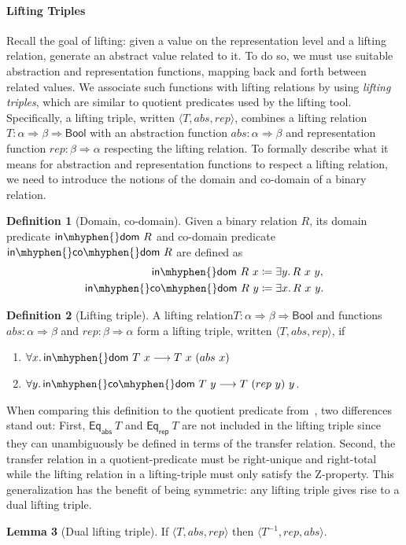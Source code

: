 \documentclass{article}
\theoremstyle{definition}
\newtheorem{definition}{Definition}[section]
\newtheorem{lemma}[definition]{Lemma}
\newcommand{\inv}{^{-1}}
\newcommand{\indom}{\mathsf{in\mhyphen{}dom}}
\newcommand{\incodom}{\mathsf{in\mhyphen{}co\mhyphen{}dom}}
\newcommand{\bool}{\mathsf{Bool}}
\newcommand{\eqrep}{\mathsf{Eq_{rep}}}
\newcommand{\eqabs}{\mathsf{Eq_{abs}}}
\newcommand{\liftrel}{lifting relation\xspace}
\newcommand{\liftrels}{lifting relations\xspace}
\begin{document}
\paragraph{Lifting Triples}
Recall the goal of lifting:
given a value on the representation level and a \liftrel,
generate an abstract value related to it.
To do so, we must use suitable abstraction and representation functions,
mapping back and forth between related values.
We associate such functions with \liftrels by using \emph{lifting triples},
which are similar to quotient predicates used by the lifting tool.
Specifically, a lifting triple,
written \(\langle T, abs, rep \rangle\),
combines a
lifting relation \(T : \alpha \Rightarrow \beta \Rightarrow \bool\) with an abstraction function \(abs : \alpha \Rightarrow \beta\) and representation function \(rep : \beta \Rightarrow \alpha\) respecting the
lifting relation.
To formally describe what it means for abstraction and representation functions to respect a \liftrel,
we need to introduce the notions of the domain and co-domain of a binary relation.
\begin{definition}[Domain, co-domain]
	Given a binary relation \(R\), its domain predicate \(\indom\ R\) and co-domain predicate \(\incodom\ R\) are defined as
	\begin{align*}
		\indom\ R\ x &\coloneqq \exists y\ldotp R\ x\ y, \\
		\incodom\ R\ y &\coloneqq \exists x\ldotp R\ x\ y.
	\end{align*}
\end{definition}
\begin{definition}[Lifting triple]\label{def-lifting-triple}
	A \liftrel \(T : \alpha \Rightarrow \beta \Rightarrow \bool\) and functions \(abs : \alpha \Rightarrow \beta\) and \(rep : \beta \Rightarrow \alpha\) form a lifting triple, written \(\langle T, abs, rep \rangle\), if
	\begin{enumerate}
    \item $\forall x\ldotp \indom\ T\ x \longrightarrow T\ x\ (abs\ x)$
    \item $\forall y\ldotp \incodom\ T\ y \longrightarrow T\ (rep\ y)\ y$.
	\end{enumerate}
\end{definition}
When comparing this definition to the quotient predicate from~\cite{huffman2013lifting},
two differences stand out:
First, \(\eqabs\ T\) and \(\eqrep\ T\) are not included in the lifting triple since they can unambiguously be defined in terms of the transfer relation.
Second, the transfer relation in a quotient-predicate must be right-unique and right-total while the lifting relation in a lifting-triple must only satisfy the Z-property.
This generalization has the benefit of being symmetric:
any lifting triple gives rise to a dual lifting triple.
\begin{lemma}[Dual lifting triple]\label{dual-lifting-triple}
  If $\langle T, abs, rep \rangle$ then $\langle T\inv, rep, abs \rangle$.
\end{lemma}
\end{document}

